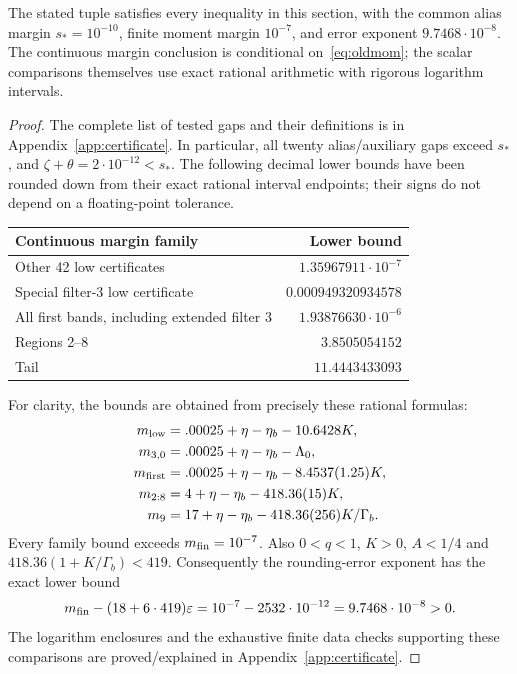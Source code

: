 \begin{proposition}\label{prop:numeric}
The stated tuple satisfies every inequality in this section, with the
common alias margin $s_*=10^{-10}$, finite moment margin $10^{-7}$,
and error exponent $9.7468\cdot10^{-8}$. The continuous margin conclusion
is conditional on~\eqref{eq:oldmom}; the scalar comparisons themselves
use exact rational arithmetic with rigorous logarithm intervals.
\end{proposition}
\begin{proof}
The complete list of tested gaps and their definitions is in
Appendix~\ref{app:certificate}. In particular, all twenty alias/auxiliary
gaps exceed $s_*$, and $\zeta+\theta=2\cdot10^{-12}<s_*$.
The following decimal lower bounds have been rounded down from their
exact rational interval endpoints; their signs do not depend on a
floating-point tolerance.
\begin{center}\small
\begin{tabular}{@{}lr@{}}\toprule
Continuous margin family & Lower bound\\\midrule
Other 42 low certificates & $1.35967911\cdot10^{-7}$\\
Special filter-3 low certificate & $0.000949320934578$\\
All first bands, including extended filter 3 & $1.93876630\cdot10^{-6}$\\
Regions 2--8 & $3.8505054152$\\
Tail & $11.4443433093$\\\bottomrule
\end{tabular}
\end{center}
For clarity, the bounds are obtained from precisely these rational formulas:
\begin{align*}
 m_{\rm low}&=.00025+\eta-\eta_b-10.6428K,\\
 m_{3,0}&=.00025+\eta-\eta_b-\Lambda_0,\\
 m_{\rm first}&=.00025+\eta-\eta_b-8.4537(1.25)K,\\
 m_{2:8}&=4+\eta-\eta_b-418.36(15)K,\\
 m_9&=17+\eta-\eta_b-418.36(256)K/\Gamma_b.
\end{align*}
Every family bound exceeds $m_{\rm fin}=10^{-7}$.
Also $0<q<1$, $K>0$, $A<1/4$ and
$418.36(1+K/\Gamma_b)<419$.
Consequently the rounding-error exponent has the exact lower bound
\[
 m_{\rm fin}-(18+6\cdot419)\varepsilon
 =10^{-7}-2532\cdot10^{-12}=9.7468\cdot10^{-8}>0.
\]
The logarithm enclosures and the exhaustive finite data checks supporting
these comparisons are proved/explained in Appendix~\ref{app:certificate}.
\end{proof}
